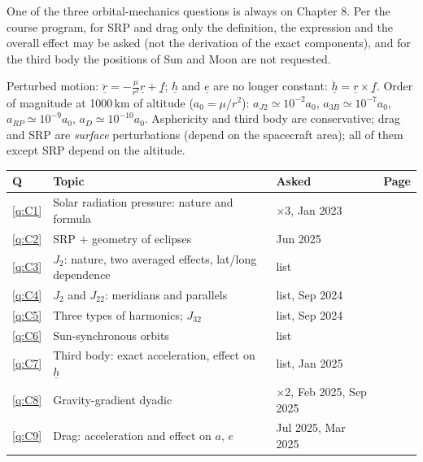 
One of the three orbital-mechanics questions is always on Chapter 8. Per the course program, for SRP and drag only the
definition, the expression and the overall effect may be asked (not the derivation of the exact components), and for the
third body the positions of Sun and Moon are not requested.

Perturbed motion: $\ddot{\underline r}=-\frac{\mu}{r^3}\underline r+\underline f$; $\underline h$ and $\underline e$ are no longer constant:
$\dot{\underline h}=\underline r\times\underline f$. Order of magnitude at 1000\,km of altitude ($a_0=\mu/r^2$):
$a_{J2}\simeq10^{-2}a_0$, $a_{3B}\simeq10^{-7}a_0$, $a_{RP}\simeq10^{-9}a_0$, $a_D\simeq10^{-10}a_0$.
Asphericity and third body are conservative; drag and SRP are \emph{surface} perturbations (depend on the spacecraft area);
all of them except SRP depend on the altitude.

\begin{center}
\small
\begin{tabular}{@{}lllr@{}}
\toprule
Q & Topic & Asked & Page\\
\midrule
\ref{q:C1} & Solar radiation pressure: nature and formula & $\times$3, Jan 2023 & \pageref{q:C1}\\
\ref{q:C2} & SRP + geometry of eclipses & Jun 2025 & \pageref{q:C2}\\
\ref{q:C3} & $J_2$: nature, two averaged effects, lat/long dependence & list & \pageref{q:C3}\\
\ref{q:C4} & $J_2$ and $J_{22}$: meridians and parallels & list, Sep 2024 & \pageref{q:C4}\\
\ref{q:C5} & Three types of harmonics; $J_{32}$ & list, Sep 2024 & \pageref{q:C5}\\
\ref{q:C6} & Sun-synchronous orbits & list & \pageref{q:C6}\\
\ref{q:C7} & Third body: exact acceleration, effect on $\underline h$ & list, Jan 2025 & \pageref{q:C7}\\
\ref{q:C8} & Gravity-gradient dyadic & $\times$2, Feb 2025, Sep 2025 & \pageref{q:C8}\\
\ref{q:C9} & Drag: acceleration and effect on $a$, $e$ & Jul 2025, Mar 2025 & \pageref{q:C9}\\
\bottomrule
\end{tabular}
\end{center}


